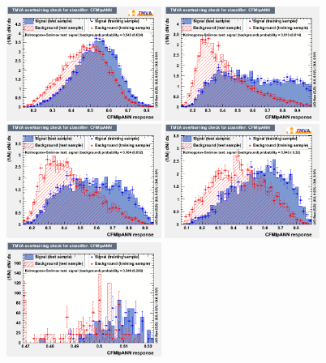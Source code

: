 \begin{figure}[hbtp]
 \begin{center}
   \includegraphics[width=0.45\textwidth]{Figures/Analysis_1_Diagrams/overtrain_CFMlpANN_6ormorej2t.png}
   \includegraphics[width=0.45\textwidth]{Figures/Analysis_1_Diagrams/overtrain_CFMlpANN_4j3t.png}
   \includegraphics[width=0.45\textwidth]{Figures/Analysis_1_Diagrams/overtrain_CFMlpANN_5j3t.png}
   \includegraphics[width=0.45\textwidth]{Figures/Analysis_1_Diagrams/overtrain_CFMlpANN_6ormorej3t.png}
   \includegraphics[width=0.45\textwidth]{Figures/Analysis_1_Diagrams/overtrain_CFMlpANN_4j4t.png}

\end{center}
\end{figure}

